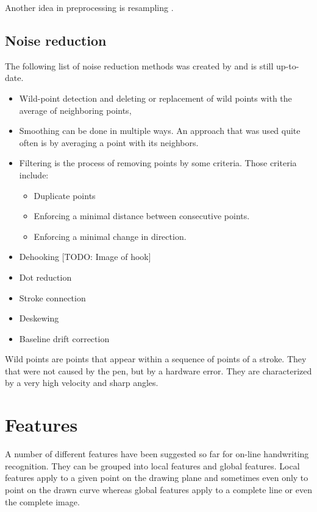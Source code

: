 Another idea in preprocessing is resampling \cite{Guyon91,ICASSP-94}.

\subsection{Noise reduction}
The following list of noise reduction methods was created by \cite{Tappert90}
and is still up-to-date.

\begin{itemize}
    \item Wild-point detection and deleting or replacement of wild points with
          the average of neighboring points\cite{Division87},
    \item Smoothing can be done in multiple ways. An approach that was used quite
          often is by averaging a point with its neighbors\cite{Groner66,Division87,Arakaw83}.
    \item Filtering is the process of removing points by some criteria. Those
          criteria include:
          \begin{itemize}
              \item Duplicate points
              \item Enforcing a minimal distance between consecutive 
                    points\cite{Tappert90}.
              \item Enforcing a minimal change in direction\cite{Tappert90}.
          \end{itemize}
    \item Dehooking [TODO: Image of hook]
    \item Dot reduction
    \item Stroke connection
    \item Deskewing
    \item Baseline drift correction
\end{itemize}

Wild points are points that appear within a sequence of points of a stroke. They
that were not caused by the pen, but by a hardware error. They are characterized
by a very high velocity and sharp angles.

\section{Features}\label{sec:features}
A number of different features have been suggested so far for on-line handwriting
recognition. They can be grouped into local features and global features.
Local features apply to a given point on the drawing plane and sometimes even
only to point on the drawn curve whereas global features apply to a complete
line or even the complete image.

